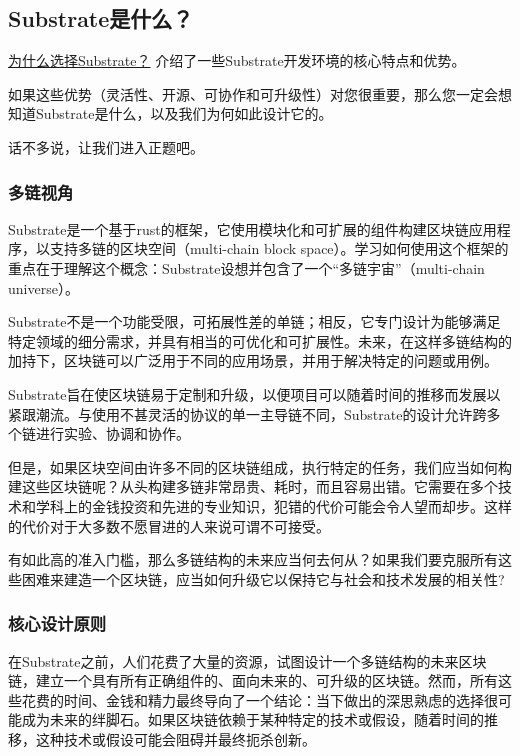 \subsection{Substrate是什么？}

\href{/fundamentals/why-substrate/}{为什么选择Substrate？}
介绍了一些Substrate开发环境的核心特点和优势。

如果这些优势（灵活性、开源、可协作和可升级性）对您很重要，那么您一定会想知道Substrate是什么，以及我们为何如此设计它的。

话不多说，让我们进入正题吧。

\hypertarget{ux591aux94feux89c6ux89d2}{%
\subsubsection{多链视角}\label{ux591aux94feux89c6ux89d2}}

Substrate是一个基于rust的框架，它使用模块化和可扩展的组件构建区块链应用程序，以支持多链的区块空间（multi-chain
block
space）。学习如何使用这个框架的重点在于理解这个概念：Substrate设想并包含了一个``多链宇宙''（multi-chain
universe）。

Substrate不是一个功能受限，可拓展性差的单链；相反，它专门设计为能够满足特定领域的细分需求，并具有相当的可优化和可扩展性。未来，在这样多链结构的加持下，区块链可以广泛用于不同的应用场景，并用于解决特定的问题或用例。

Substrate旨在使区块链易于定制和升级，以便项目可以随着时间的推移而发展以紧跟潮流。与使用不甚灵活的协议的单一主导链不同，Substrate的设计允许跨多个链进行实验、协调和协作。

但是，如果区块空间由许多不同的区块链组成，执行特定的任务，我们应当如何构建这些区块链呢？从头构建多链非常昂贵、耗时，而且容易出错。它需要在多个技术和学科上的金钱投资和先进的专业知识，犯错的代价可能会令人望而却步。这样的代价对于大多数不愿冒进的人来说可谓不可接受。

有如此高的准入门槛，那么多链结构的未来应当何去何从？如果我们要克服所有这些困难来建造一个区块链，应当如何升级它以保持它与社会和技术发展的相关性?

\hypertarget{ux6838ux5fc3ux8bbeux8ba1ux539fux5219}{%
\subsubsection{核心设计原则}\label{ux6838ux5fc3ux8bbeux8ba1ux539fux5219}}

在Substrate之前，人们花费了大量的资源，试图设计一个多链结构的未来区块链，建立一个具有所有正确组件的、面向未来的、可升级的区块链。然而，所有这些花费的时间、金钱和精力最终导向了一个结论：当下做出的深思熟虑的选择很可能成为未来的绊脚石。如果区块链依赖于某种特定的技术或假设，随着时间的推移，这种技术或假设可能会阻碍并最终扼杀创新。


